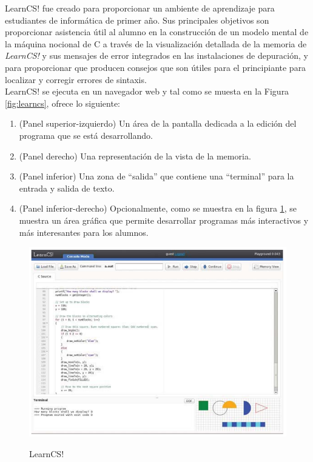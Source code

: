 LearnCS! fue creado para proporcionar un ambiente de aprendizaje para estudiantes de informática de primer año. Sus principales objetivos son proporcionar asistencia útil al alumno en la construcción de un modelo mental de la máquina nocional de C a través de la visualización detallada de la memoria de \emph{LearnCS!} y sus mensajes de error integrados en las instalaciones de depuración, y para proporcionar que producen consejos que son útiles para el principiante para localizar y corregir errores de sintaxis\cite{lipman_learncs_2014}.\\

LearnCS! se ejecuta en un navegador web y tal como se muesta en la Figura \ref{fig:learncs}, ofrece lo siguiente:

\begin{enumerate}
  \item (Panel superior-izquierdo) Un área de la pantalla dedicada a la edición del programa que se está desarrollando.
  \item (Panel derecho) Una representación de la vista de la memoria.
  \item (Panel inferior) Una zona de ``salida'' que contiene una ``terminal'' para la entrada y salida de texto.
  \item (Panel inferior-derecho) Opcionalmente, como se muestra en la figura \ref{fig:learncs2}, se muestra un área gráfica que permite desarrollar programas más interactivos y más interesantes para los alumnos.
\end{enumerate}

\begin{figure}[!h]
  \centering
  \includegraphics[scale=0.5]{figuras/learncs2.png}\\
  \caption[LearnCS]{LearnCS!}\label{fig:learncs2}
\end{figure}

